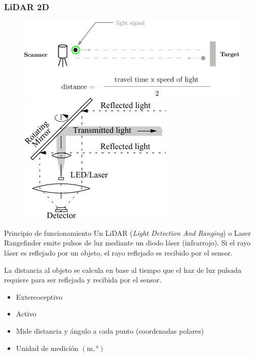\begin{frame}
    \frametitle{LiDAR 2D}
    
    \begin{figure}[!h]
        \centering
        \includegraphics[width=0.6\columnwidth]{images/lidar_concept.pdf}
        \includegraphics[width=0.35\columnwidth]{images/lidar.pdf}
    \end{figure}
    \footnotesize
    \begin{block}{Principio de funcionamiento}
     Un LiDAR (\emph{Light Detection And Ranging}) o Laser Rangefinder emite pulsos de luz mediante un diodo láser (infrarrojo). Si el rayo láser es reflejado por un objeto, el rayo reflejado es recibido por el sensor.
     
     La distancia al objeto se calcula en base al tiempo que el haz de luz pulsada requiere para ser reflejada y recibida por el sensor.
    \end{block}
    
    \begin{itemize}
        \item Extereoceptivo
        \item Activo
        \item Mide distancia y ángulo a cada punto (coordenadas polares)
        \item Unidad de medición $(\si{\meter},\si{\degree})$
    \end{itemize}


\end{frame}


